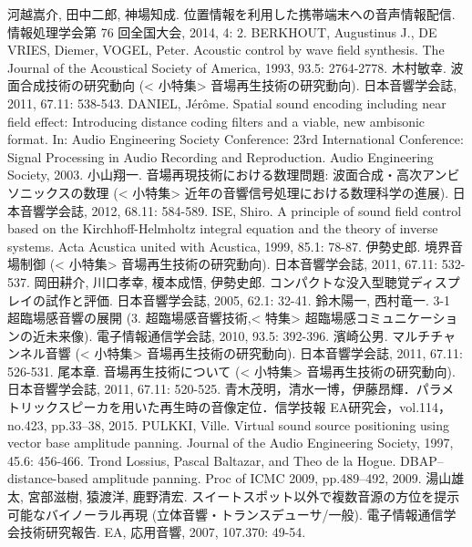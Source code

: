 \begin{thebibliography}{99}
 河越嵩介, 田中二郎, 神場知成. 位置情報を利用した携帯端末への音声情報配信. 情報処理学会第 76 回全国大会, 2014, 4: 2.
       BERKHOUT, Augustinus J., DE VRIES, Diemer, VOGEL, Peter. Acoustic control by wave field synthesis. The Journal of the Acoustical Society of America, 1993, 93.5: 2764-2778.
   木村敏幸. 波面合成技術の研究動向 (< 小特集> 音場再生技術の研究動向). 日本音響学会誌, 2011, 67.11: 538-543.
       DANIEL, Jérôme. Spatial sound encoding including near field effect: Introducing distance coding filters and a viable, new ambisonic format. In: Audio Engineering Society Conference: 23rd International Conference: Signal Processing in Audio Recording and Reproduction. Audio Engineering Society, 2003.
   小山翔一. 音場再現技術における数理問題: 波面合成・高次アンビソニックスの数理 (< 小特集> 近年の音響信号処理における数理科学の進展). 日本音響学会誌, 2012, 68.11: 584-589.
       ISE, Shiro. A principle of sound field control based on the Kirchhoff-Helmholtz integral equation and the theory of inverse systems. Acta Acustica united with Acustica, 1999, 85.1: 78-87.
   伊勢史郎. 境界音場制御 (< 小特集> 音場再生技術の研究動向). 日本音響学会誌, 2011, 67.11: 532-537.
 岡田耕介, 川口孝幸, 榎本成悟, 伊勢史郎. コンパクトな没入型聴覚ディスプレイの試作と評価. 日本音響学会誌, 2005, 62.1: 32-41.
 鈴木陽一, 西村竜一. 3-1 超臨場感音響の展開 (3. 超臨場感音響技術,< 特集> 超臨場感コミュニケーションの近未来像). 電子情報通信学会誌, 2010, 93.5: 392-396.
 濱崎公男. マルチチャンネル音響 (< 小特集> 音場再生技術の研究動向). 日本音響学会誌, 2011, 67.11: 526-531.
 尾本章. 音場再生技術について (< 小特集> 音場再生技術の研究動向). 日本音響学会誌, 2011, 67.11: 520-525.
   青木茂明，清水一博，伊藤昂輝．パラメトリックスピーカを用いた再生時の音像定位．信学技報 EA研究会，vol.114，no.423, pp.33--38, 2015.
 PULKKI, Ville. Virtual sound source positioning using vector base amplitude panning. Journal of the Audio Engineering Society, 1997, 45.6: 456-466.
      Trond Lossius, Pascal Baltazar, and Theo de la Hogue. DBAP–distance-based amplitude panning. Proc of ICMC 2009, pp.489--492, 2009.
 湯山雄太, 宮部滋樹, 猿渡洋, 鹿野清宏. スイートスポット以外で複数音源の方位を提示可能なバイノーラル再現 (立体音響・トランスデューサ/一般). 電子情報通信学会技術研究報告. EA, 応用音響, 2007, 107.370: 49-54.


\end{thebibliography}
